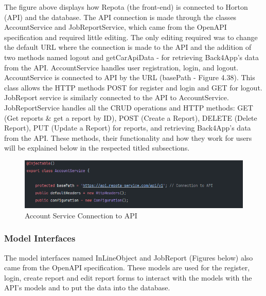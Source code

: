 The figure above displays how Repota (the front-end) is connected to Horton (API) and the database. The API connection is made through the classes AccountService and JobReportService, which came from the OpenAPI specification and required little editing. The only editing required was to change the default URL where the connection is made to the API and the addition of two methods named logout and getCarApiData - for retrieving Back4App's data from the API. AccountService handles user registration, login, and logout. AccountService is connected to API by the URL (basePath - Figure 4.38). This class allows the HTTP methods POST for register and login and GET for logout. JobReport service is similarly connected to the API to AccountService. JobReportService handles all the CRUD operations and HTTP methods: GET (Get reports \& get a report by ID), POST (Create a Report), DELETE (Delete Report), PUT (Update a Report) for reports, and retrieving Back4App's data from the API. These methods, their functionality and how they work for users will be explained below in the respected titled subsections.

\begin{figure}[H]
    \caption{Account Service Connection to API}
    \label{image:a-s-conn}
    \centering
    \includegraphics[width=1.0\textwidth]{images/repota_and_horton/account_service.png}
\end{figure}

\subsubsection{Model Interfaces}
The model interfaces named InLineObject and JobReport (Figures below) also came from the OpenAPI specification. These models are used for the register, login, create report and edit report forms to interact with the models with the API's models and to put the data into the database. 


